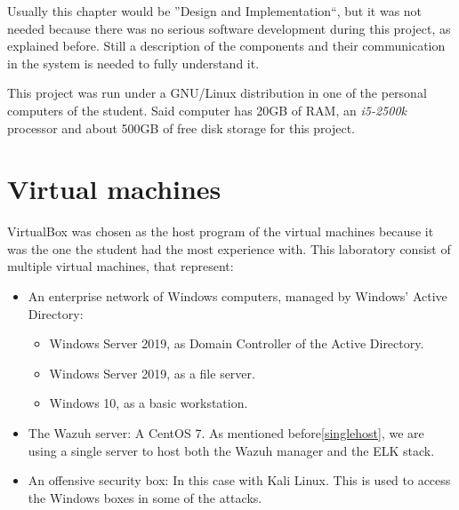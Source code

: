 Usually this chapter would be ''Design and Implementation``, but it was not needed because there was no serious software development during this project, as explained before.
Still a description of the components and their communication in the system is needed to fully understand it.

\linej
\linej
This project was run under a GNU/Linux distribution in one of the personal computers of the student.
Said computer has 20GB of RAM, an \textit{i5-2500k} processor and about 500GB of free disk storage for this project.

\section{Virtual machines}
VirtualBox was chosen as the host program of the virtual machines because it was the one the student had the most experience with.
\linej
This laboratory consist of multiple virtual machines, that represent:
\begin{itemize}
	\item An enterprise network of Windows computers, managed by Windows' Active Directory:
		\begin{itemize}
			\item Windows Server 2019, as Domain Controller of the Active Directory.
			\item Windows Server 2019, as a file server.
			\item Windows 10, as a basic workstation.
		\end{itemize}
	\item The Wazuh server: A CentOS 7. As mentioned before\ref{singlehost}, we are using a single server to host both the Wazuh manager and the ELK stack.
	\item An offensive security box: In this case with Kali Linux. This is used to access the Windows boxes in some of the attacks.
\end{itemize}

